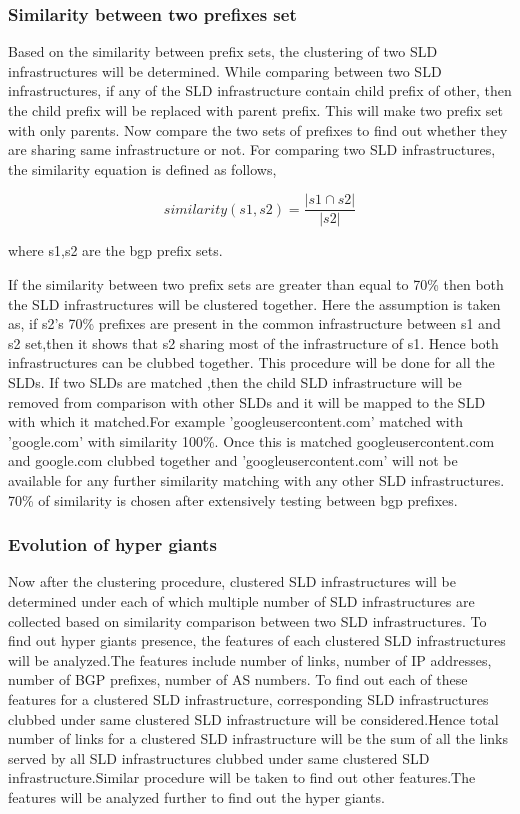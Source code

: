 \subsubsection{Similarity between two prefixes set}
Based on the similarity between prefix sets, the clustering of two SLD infrastructures will be determined. While comparing between two SLD infrastructures, if any of the SLD infrastructure contain child prefix of other, then the child prefix will be replaced with parent prefix. This will make two prefix set with only parents. Now compare the two sets of prefixes to find out whether they are sharing same infrastructure or not. For comparing two SLD infrastructures, the similarity equation is defined as follows,

\begin{equation}
similarity(s1, s2)= \frac{|s1 \cap s2|}{|s2|}
\end{equation}

where s1,s2 are the bgp prefix sets.

If the similarity between two prefix sets are greater than equal to 70\% then both the SLD infrastructures will be clustered together. Here the assumption is taken as, if s2’s 70\% prefixes are present in the common infrastructure between s1 and s2 set,then it shows
that s2 sharing most of the infrastructure of s1. Hence both infrastructures can be clubbed together. This procedure will be done for all the SLDs. If two SLDs are matched ,then the child SLD infrastructure will be removed from comparison with other SLDs and it will be mapped to the SLD with which it matched.For example ’googleusercontent.com’ matched with ’google.com’ with similarity 100\%. Once this is matched googleusercontent.com and 
google.com clubbed together and ’googleusercontent.com’ will not be available for any further similarity matching with any other SLD infrastructures. 70\% of similarity is chosen after extensively testing between bgp prefixes.
\subsubsection{Evolution of hyper giants}
Now after the clustering procedure, clustered SLD infrastructures will be determined
under each of which multiple number of SLD infrastructures are collected based on similarity comparison between two SLD infrastructures. To find out hyper giants presence, the features of each clustered SLD infrastructures will be analyzed.The features include number of links, number of IP addresses, number of BGP prefixes, number of AS numbers. To find out each of these features for a  clustered SLD infrastructure, corresponding SLD infrastructures clubbed  under same clustered SLD infrastructure will be considered.Hence total number of links for a clustered SLD infrastructure will be the sum of all the links served by all SLD infrastructures clubbed under same clustered SLD infrastructure.Similar procedure will be taken to find out other features.The features will be analyzed further to find out the hyper giants.
